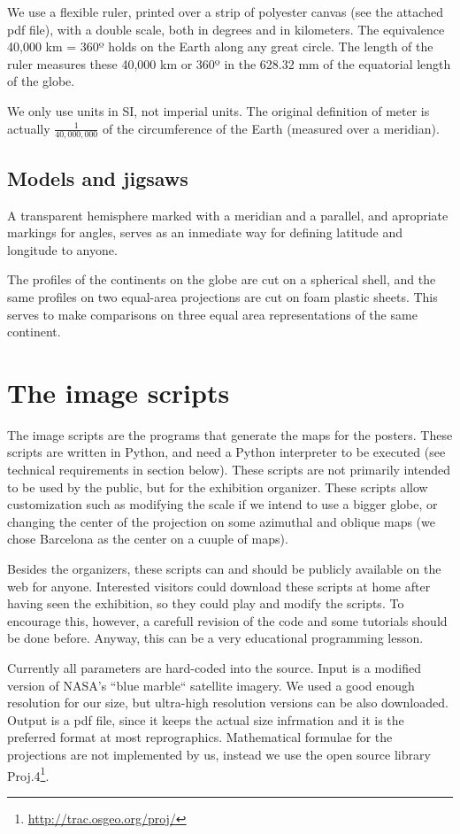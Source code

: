 \documentclass[a4paper,12pt]{article}
\begin{document}
We use a flexible ruler, printed over a strip of polyester canvas (see the attached pdf file), with a double scale, both in degrees and in
kilometers. The equivalence 40,000 km = 360º holds on the Earth along any great circle. The length of the ruler measures these 40,000 km or
360º in the 628.32 mm of the equatorial length of the globe. 

We only use units in SI, not imperial units. The original definition of meter is actually $\frac{1}{40,000,000}$ of the circumference of
the Earth (measured over a meridian).

\subsection{Models and jigsaws}
A transparent hemisphere marked with a meridian and a parallel, and apropriate markings for angles, serves as an inmediate way for defining
latitude and longitude to anyone. 

The profiles of the continents on the globe are cut on a spherical shell, and the same profiles on two equal-area projections are cut on
foam plastic sheets. This serves to make comparisons on three equal area representations of the same continent.


\section{The image scripts}
The image scripts are the programs that generate the maps for the posters. These scripts are written in Python, and need a Python
interpreter to be executed (see technical requirements in section below). These scripts are not primarily intended to be used by the public,
but for the exhibition organizer. These scripts allow customization such as modifying the scale if we intend to use a bigger globe, or
changing the center of the projection on some azimuthal and oblique maps (we chose Barcelona as the center on a cuuple of maps).

Besides the organizers, these scripts can and should be publicly available on the web for anyone. Interested visitors could download these
scripts at home after having seen the exhibition, so they could play and modify the scripts. To encourage this, however, a carefull
revision of the code and some tutorials should be done before. Anyway, this can be a very educational programming lesson.

Currently all parameters are hard-coded into the source. Input is a modified version of NASA's ``blue marble`` satellite imagery. We used a
good enough resolution for our size, but ultra-high resolution versions can be also downloaded. Output is a pdf file, since it keeps the
actual size infrmation and it is the preferred format at most reprographics. Mathematical formulae for the projections are not implemented
by us, instead we use the open source library Proj.4\footnote{\url{http://trac.osgeo.org/proj/}}.
\end{document}

